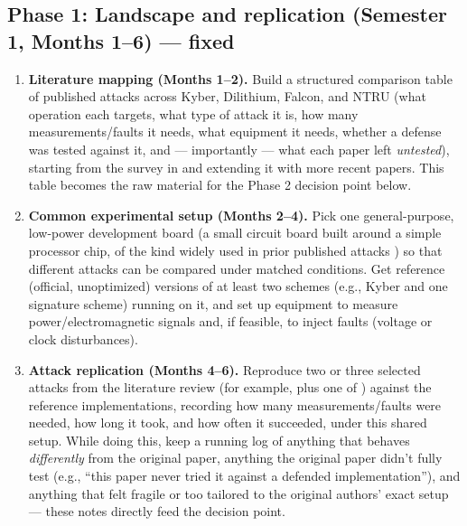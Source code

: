 \documentclass[11pt,a4paper]{article}
\begin{document}
\subsection*{Phase 1: Landscape and replication (Semester 1, Months 1--6) --- fixed}
\begin{enumerate}[leftmargin=*]
  \item \textbf{Literature mapping (Months 1--2).} Build a structured comparison table of published attacks across Kyber, Dilithium, Falcon, and NTRU (what operation each targets, what type of attack it is, how many measurements/faults it needs, what equipment it needs, whether a defense was tested against it, and --- importantly --- what each paper left \emph{untested}), starting from the survey in \cite{ravi2024survey} and extending it with more recent papers. This table becomes the raw material for the Phase 2 decision point below.
  \item \textbf{Common experimental setup (Months 2--4).} Pick one general-purpose, low-power development board (a small circuit board built around a simple processor chip, of the kind widely used in prior published attacks \cite{wang2024twostep,ravi2019exploitingdeterminism}) so that different attacks can be compared under matched conditions. Get reference (official, unoptimized) versions of at least two schemes (e.g., Kyber and one signature scheme) running on it, and set up equipment to measure power/electromagnetic signals and, if feasible, to inject faults (voltage or clock disturbances).
  \item \textbf{Attack replication (Months 4--6).} Reproduce two or three selected attacks from the literature review (for example, \cite{wang2024twostep} plus one of \cite{karabulut2021falcondown,singletracefalcon2025,bauer2024falconfault}) against the reference implementations, recording how many measurements/faults were needed, how long it took, and how often it succeeded, under this shared setup. While doing this, keep a running log of anything that behaves \emph{differently} from the original paper, anything the original paper didn't fully test (e.g., ``this paper never tried it against a defended implementation''), and anything that felt fragile or too tailored to the original authors' exact setup --- these notes directly feed the decision point.
\end{enumerate}
\end{document}
